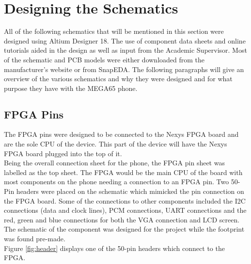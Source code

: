 
\section{Designing the Schematics}

	All of the following schematics that will be mentioned in this section were designed using Altium Designer 18. 
The use of component data sheets and online tutorials aided in the design as well as input from the Academic Supervisor. 
Most of the schematic and PCB models were either downloaded from the manufacturer's website or from SnapEDA. 
The following paragraphs will give an overview of the various schematics and why they were designed and for what purpose they have with the MEGA65 phone.

\subsection{FPGA Pins}
\label{chap:FPGA}
	The FPGA pins were designed to be connected to the Nexys FPGA board and are the sole CPU of the device. 
This part of the device will have the Nexys FPGA board plugged into the top of it.\\
Being the overall connection sheet for the phone, the FPGA pin sheet was labelled as the top sheet. 
The FPGA would be the main CPU of the board with most components on the phone needing a connection to an FPGA pin. 
Two 50-Pin headers were placed on the schematic which mimicked the pin connection on the FPGA board. 
Some of the connections to other components included the I2C connections (data and clock lines), PCM connections, UART connections and the red, green and blue connections for both the VGA connection and LCD screen.\\
The schematic of the component was designed for the project while the footprint was found pre-made.\\
Figure \ref{fig:header} displays one of the 50-pin headers which connect to the FPGA.

